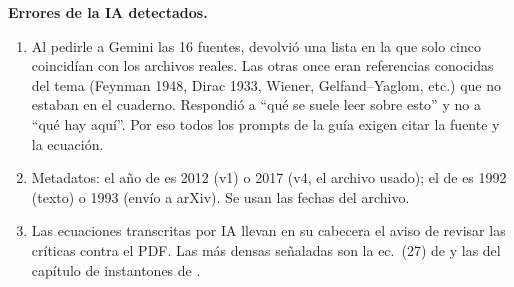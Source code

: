 \textbf{Errores de la IA detectados.}
\begin{enumerate}
    \item Al pedirle a Gemini las 16 fuentes, devolvió una lista en la que solo cinco coincidían con los archivos reales. Las otras once eran referencias conocidas del tema (Feynman 1948, Dirac 1933, Wiener, Gelfand--Yaglom, etc.) que no estaban en el cuaderno. Respondió a ``qué se suele leer sobre esto'' y no a ``qué hay aquí''. Por eso todos los prompts de la guía exigen citar la fuente y la ecuación.
    \item Metadatos: el año de  es 2012 (v1) o 2017 (v4, el archivo usado); el de  es 1992 (texto) o 1993 (envío a arXiv). Se usan las fechas del archivo.
    \item Las ecuaciones transcritas por IA llevan en su cabecera el aviso de revisar las críticas contra el PDF. Las más densas señaladas son la ec.~(27) de  y las del capítulo de instantones de .
\end{enumerate}
